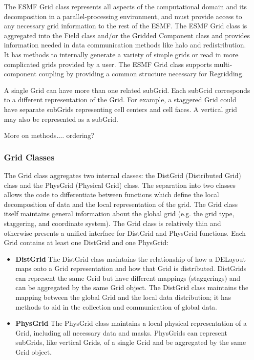 %


The ESMF Grid class represents all aspects of the computational domain and its
decomposition in a parallel-processing environment, and must provide access to
any necessary grid information to the rest of the ESMF.  The ESMF Grid class
is aggregated into the Field class and/or the Gridded Component class
and provides information needed in data communication methods like halo and
redistribution.  It has methods to internally generate a variety of
simple grids or read in more complicated grids provided by a user.  The
ESMF Grid class supports multi-component coupling by providing a common
structure necessary for Regridding.

A single Grid can have more than one related subGrid.  Each subGrid corresponds to
a different representation of the Grid.  For example, a staggered Grid could
have separate subGrids representing cell centers and cell faces.  A vertical
grid may also be represented as a subGrid.

More on methods....   ordering?

\subsubsection{Grid Classes}
The Grid class aggregates two internal classes: the DistGrid (Distributed
Grid) class and the PhysGrid (Physical Grid) class.  The separation into two
classes allows the code to differentiate between functions which define the
local decomposition of data and the local representation of the grid.  The Grid
class itself maintains general information about the global grid (e.g. the
grid type, staggering, and coordinate system).  The Grid class is relatively
thin and otherwise presents a unified interface for DistGrid and PhysGrid
functions.  Each Grid contains at least one DistGrid and one PhysGrid:
\begin{itemize}
\item {\bf DistGrid} The DistGrid class maintains the relationship of how
a DELayout maps onto a Grid representation and how that Grid is distributed.
DistGrids can represent the same Grid but have different mappings (staggerings)
and can be aggregated by the same Grid object. The DistGrid class maintains the
mapping between the global Grid and the local data distribution;  it has
methods to aid in the collection and communication of global data.
\item {\bf PhysGrid} The PhysGrid class maintains a local physical
representation of a Grid, including all necessary data and masks.  PhysGrids
can represent subGrids, like vertical Grids, of a single Grid and be
aggregated by the same Grid object. 
\end{itemize}
